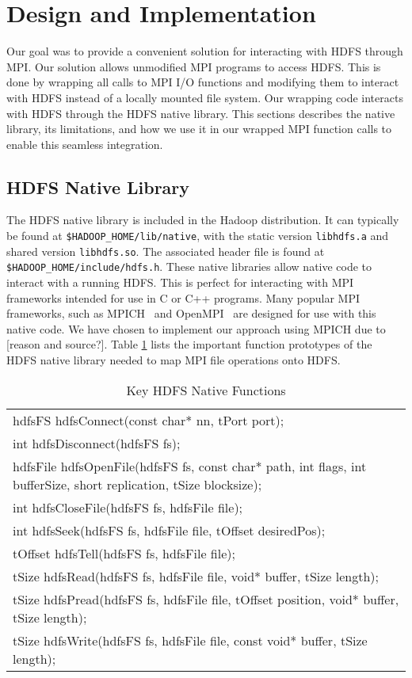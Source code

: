 \section{Design and Implementation}
Our goal was to provide a convenient solution for interacting with HDFS through MPI. Our solution allows unmodified MPI programs to access HDFS. This is done by wrapping all calls to MPI I/O functions and modifying them to interact with HDFS instead of a locally mounted file system. Our wrapping code interacts with HDFS through the HDFS native library. This sections describes the native library, its limitations, and how we use it in our wrapped MPI function calls to enable this seamless integration.

\subsection{HDFS Native Library}
The HDFS native library is included in the Hadoop distribution. It can typically be found at \texttt{\$HADOOP\_HOME/lib/native}, with the static version \texttt{libhdfs.a} and shared version \texttt{libhdfs.so}. The associated header file is found at \texttt{\$HADOOP\_HOME/include/hdfs.h}. These native libraries allow native code to interact with a running HDFS. This is perfect for interacting with MPI frameworks intended for use in C or C++ programs. Many popular MPI frameworks, such as MPICH~\cite{mpich} and OpenMPI~\cite{openmpi} are designed for use with this native code. We have chosen to implement our approach using MPICH due to [reason and source?]. Table \ref{table:libhdfs} lists the important function prototypes of the HDFS native library needed to map MPI file operations onto HDFS.

\begin{table}[ht]
\caption{Key HDFS Native Functions}
{\ttfamily
\begin{tabular}{l}
\hline\hline
hdfsFS hdfsConnect(const char* nn, tPort port); \\
int hdfsDisconnect(hdfsFS fs); \\
hdfsFile hdfsOpenFile(hdfsFS fs, const char* path, int flags,
                          int bufferSize, short replication, tSize blocksize); \\
int hdfsCloseFile(hdfsFS fs, hdfsFile file); \\
int hdfsSeek(hdfsFS fs, hdfsFile file, tOffset desiredPos); \\
tOffset hdfsTell(hdfsFS fs, hdfsFile file); \\
tSize hdfsRead(hdfsFS fs, hdfsFile file, void* buffer, tSize length); \\
tSize hdfsPread(hdfsFS fs, hdfsFile file, tOffset position,
                    void* buffer, tSize length); \\
tSize hdfsWrite(hdfsFS fs, hdfsFile file, const void* buffer,
                    tSize length); \\
\hline\hline
\end{tabular}
}
\label{table:libhdfs}
\end{table}
					
